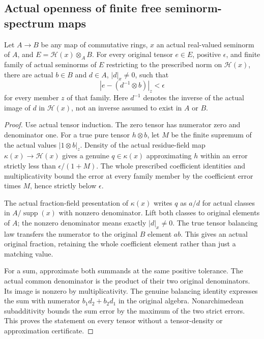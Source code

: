 \subsection{Actual openness of finite free seminorm-spectrum maps}
\label{subsec:finite-free-spectrum-openness}

\begin{lemma}
\label{spectrum:actual-completed-tensor-fraction-approximation}
Let $A\to B$ be any map of commutative rings, $x$ an actual real-valued
seminorm of $A$, and $E=\mathcal H(x)\otimes_A B$. For every original
tensor $e\in E$, positive $\epsilon$, and finite family of actual
seminorms of $E$ restricting to the prescribed norm on $\mathcal H(x)$,
there are actual $b\in B$ and $d\in A$, $|d|_x\ne0$, such that
\[
  \left|e-(d^{-1}\otimes b)\right|_z<\epsilon
\]
for every member $z$ of that family. Here $d^{-1}$ denotes the inverse
of the actual image of $d$ in $\mathcal H(x)$, not an inverse assumed
to exist in $A$ or $B$.
\leanok
\end{lemma}
\begin{proof}
Use actual tensor induction. The zero tensor has numerator zero and
denominator one. For a true pure tensor $h\otimes b$, let $M$ be the
finite supremum of the actual values $|1\otimes b|_z$. Density of the
actual residue-field map $\kappa(x)\to\mathcal H(x)$ gives a genuine
$q\in\kappa(x)$ approximating $h$ within an error strictly less
than $\epsilon/(1+M)$. The whole prescribed coefficient identities
and multiplicativity bound the error at every family member by the
coefficient error times $M$, hence strictly below $\epsilon$.

The actual fraction-field presentation of $\kappa(x)$ writes $q$ as
$a/d$ for actual classes in $A/\operatorname{supp}(x)$ with nonzero
denominator. Lift both classes to original elements of $A$; the
nonzero denominator means exactly $|d|_x\ne0$. The true tensor
balancing law transfers the numerator to the original $B$ element
$ab$. This gives an actual original fraction, retaining the whole
coefficient element rather than just a matching value.

For a sum, approximate both summands at the same positive tolerance.
The actual common denominator is the product of their two original
denominators. Its image is nonzero by multiplicativity. The genuine
balancing identity expresses the sum with numerator
$b_1d_2+b_2d_1$ in the original algebra. Nonarchimedean subadditivity
bounds the sum error by the maximum of the two strict errors. This
proves the statement on every tensor without a tensor-density or
approximation certificate.
\end{proof}


